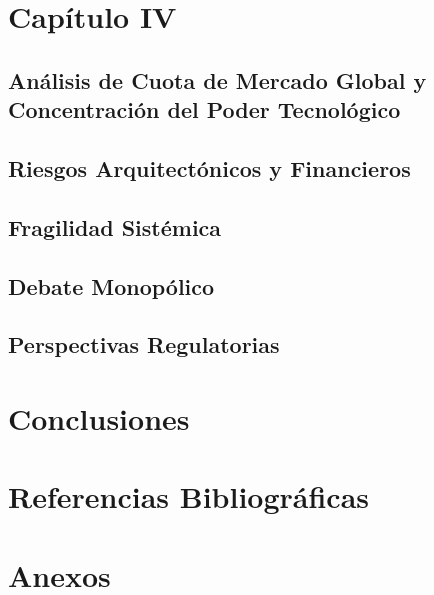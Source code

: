 \documentclass[12pt,a4paper]{article}
\begin{document}
\newpage

\section{Capítulo IV}
\subsection{Análisis de Cuota de Mercado Global y Concentración del Poder Tecnológico}

\subsection{Riesgos Arquitectónicos y Financieros}

\subsection{Fragilidad Sistémica}

\subsection{Debate Monopólico}

\subsection{Perspectivas Regulatorias}
\newpage

\section{Conclusiones}
\newpage

\section{Referencias Bibliográficas}
\nocite{*} %
\printbibliography[heading=none]
\newpage

\section{Anexos}
\end{document}
